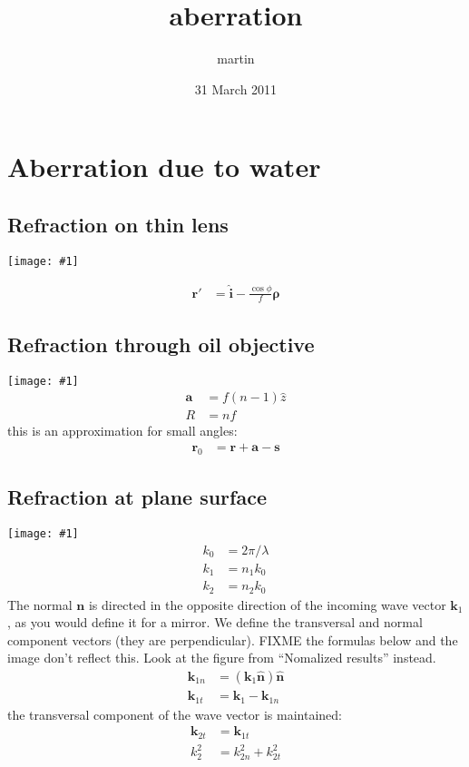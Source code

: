\documentclass[11pt]{article}
\title{aberration}
\author{martin}
\date{31 March 2011}
\begin{document}
\maketitle

\setcounter{tocdepth}{3}
\tableofcontents
\vspace*{1cm}

\newcommand{\vect}[1]{\mathbf{#1}}
\renewcommand{\r}{\vect r}
\renewcommand{\a}{\vect a}
\newcommand{\s}{\vect s}
\renewcommand{\k}{\vect k}

\newcommand{\nvect}[1]{\vect{\hat{#1}}}
\renewcommand{\i}{\nvect i}
\newcommand{\n}{\nvect n}
\newcommand{\vrho}{\vect\rho}
\newcommand{\bild}[1]{\texttt{[image: \#1]}}
\section{Aberration due to water}
\subsection{Refraction on thin lens}
\bild{thin-lens.jpg}

\begin{align}
  \r'&=\i- \frac{\cos\phi}{f} \vrho
\end{align}
\subsection{Refraction through oil objective}
\bild{objective.jpg}
\begin{align}
  \a &= f (n-1) \hat z \\
  R &= nf
\end{align}
this is an approximation for small angles: 
\begin{align}
  \r_0 &= \r + \a - \s
\end{align}
\subsection{Refraction at plane surface}
\bild{slab.jpg}
\begin{align}
  k_0&=2\pi/\lambda\\
  k_1&=n_1 k_0\\
  k_2&=n_2 k_0
\end{align}
The normal $\vect{n}$ is directed in the opposite direction of the incoming
wave vector $\k_1$, as you would define it for a mirror. We define the
transversal and normal component vectors (they are perpendicular). FIXME the formulas below and the image don't reflect this. Look at the figure from ``Nomalized results'' instead.
\begin{align}
  \k_{1n}&=(\k_1\n)\n\\ 
  \k_{1t}&=\k_1 - \k_{1n}
\end{align}
the transversal component of the wave vector is maintained:
\begin{align}
  \k_{2t}&=\k_{1t}\\
  k_2^2&=k_{2n}^2 + k_{2t}^2
\end{align}
\end{document}
